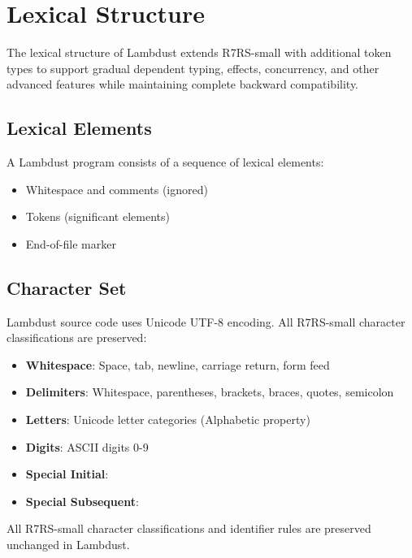 \chapter{Lexical Structure}
\label{ch:lexical}

The lexical structure of Lambdust extends R7RS-small with additional token types to support gradual dependent typing, effects, concurrency, and other advanced features while maintaining complete backward compatibility.

\section{Lexical Elements}
\label{sec:lexical-elements}

A Lambdust program consists of a sequence of lexical elements:
\begin{itemize}
\item Whitespace and comments (ignored)
\item Tokens (significant elements)
\item End-of-file marker
\end{itemize}

\section{Character Set}
\label{sec:charset}

Lambdust source code uses Unicode UTF-8 encoding. All R7RS-small character classifications are preserved:

\begin{itemize}
\item \textbf{Whitespace}: Space, tab, newline, carriage return, form feed
\item \textbf{Delimiters}: Whitespace, parentheses, brackets, braces, quotes, semicolon
\item \textbf{Letters}: Unicode letter categories (Alphabetic property)  
\item \textbf{Digits}: ASCII digits 0-9
\item \textbf{Special Initial}: 
\item \textbf{Special Subsequent}: 
\end{itemize}

\begin{compatibility}
All R7RS-small character classifications and identifier rules are preserved unchanged in Lambdust.
\end{compatibility}

